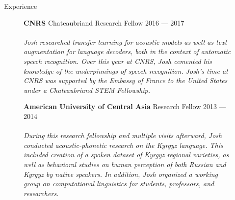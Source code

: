 \documentclass{resume} %
\begin{document}
\begin{rSection}{Experience}
  \begin{figure}[H]
    \begin{minipage}{0.2\textwidth}
      \centering
      
    \end{minipage}
    \begin{minipage}{0.8\textwidth}
      {\bf CNRS} \hfill Chateaubriand Research Fellow  \hspace{0.5cm} {2016 --- 2017} \\ \\
      \textit{Josh researched transfer-learning for acoustic models as well as text augmentation for language decoders, both in the context of automatic speech recognition. Over this year at CNRS, Josh cemented his knowledge of the underpinnings of speech recognition. Josh's time at CNRS was supported by the Embassy of France to the United States under a Chateaubriand STEM Fellowship.}
    \end{minipage}
  \end{figure}

  \begin{figure}[H]
    \begin{minipage}{0.2\textwidth}
      \centering
      
    \end{minipage}
    \begin{minipage}{0.8\textwidth}
      {\bf American University of Central Asia} \hfill Research Fellow  \hspace{0.5cm} {2013 --- 2014} \\ \\
      \textit{During this research fellowship and multiple visits afterward, Josh conducted acoustic-phonetic research on the Kyrgyz language. This included creation of a spoken dataset of Kyrgyz regional varieties, as well as behavioral studies on human perception of both Russian and Kyrgyz by native speakers. In addition, Josh organized a working group on computational linguistics for students, professors, and researchers.}
    \end{minipage}
  \end{figure}

\end{rSection}
\end{document}
